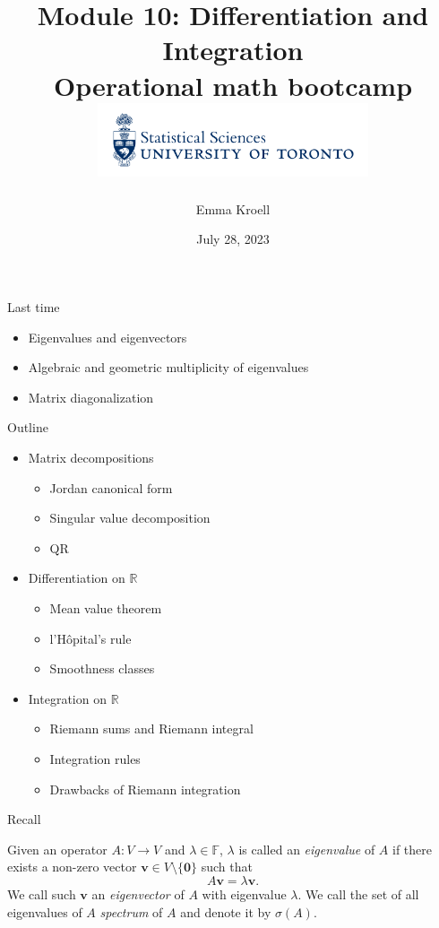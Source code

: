 \documentclass [aspectratio=169]{beamer}
\title[]{Module 10: Differentiation and Integration \\ {\large Operational math bootcamp}\\ \includegraphics[width=8cm]{dept_logo.png}\vspace{-1em}}
\author[]{Emma Kroell}
\institute[]{University of Toronto}
\date{July 28, 2023}
\newcommand{\bv}{{\mathbf{v}}}
\newcommand{\zerovec}{{\mathbf{0}}}
\newcommand{\R}{{\mathbb{R}}}
\newcommand{\F}{{\mathbb{F}}}
\begin{document}
{
\begin{frame}
    \titlepage
\end{frame}
}

\begin{frame}{Last time}
    \begin{itemize}
      \setlength\itemsep{0.5em}
    	\item Eigenvalues and eigenvectors
	\item Algebraic and geometric multiplicity of eigenvalues
	\item Matrix diagonalization
    \end{itemize}
\end{frame}

\begin{frame}{Outline}
    \begin{itemize}
      \setlength\itemsep{0.5em}
          \item Matrix decompositions
	\begin{itemize}
      \setlength\itemsep{0.25em}
	\item Jordan canonical form
	\item Singular value decomposition
	\item QR
    \end{itemize}
    	\item Differentiation on $\R$
	\begin{itemize}
      \setlength\itemsep{0.25em}
	\item Mean value theorem
	\item l'H\^{o}pital's rule
	\item Smoothness classes
    \end{itemize}
	\item Integration on $\R$
	\begin{itemize}
      \setlength\itemsep{0.25em}
	\item Riemann sums and Riemann integral
	\item Integration rules
	\item Drawbacks of Riemann integration
    \end{itemize}
    \end{itemize}
\end{frame}

\begin{frame}{Recall}

\begin{definition}
Given an operator $A \colon V \to V$ and $\lambda \in \F$, $\lambda$ is called an \emph{eigenvalue} of $A$ if there exists a non-zero vector $\bv \in V\setminus\{\zerovec\}$ such that 
$$A \bv = \lambda \bv.$$
We call such $\bv$ an \emph{eigenvector} of $A$ with eigenvalue $\lambda$. We call the set of all eigenvalues of $A$ \emph{spectrum} of $A$ and denote it by $\sigma(A)$.
\end{definition}
\end{frame}
\end{document}
